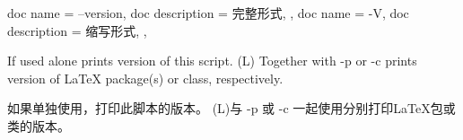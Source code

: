 \begin{docKeys}[
    doc no index,   %
    doc parameter = {~},
    ]
    {
    {
        doc name        = --version,
        doc description = 完整形式,
    },
    {
        doc name        = -V,
        doc description = 缩写形式,
    },
    }
    
    If used alone prints version of this script.
    (L) Together with -p or -c prints version of LaTeX package(s) or class, respectively.
    
    如果单独使用，打印此脚本的版本。 (L)与 -p 或 -c 一起使用分别打印LaTeX包或类的版本。
\end{docKeys}
    
    